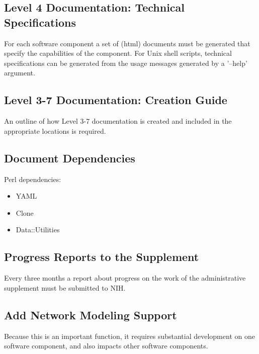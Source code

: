 \documentclass[12pt]{article}
\begin{document}
\subsection{Level 4 Documentation: Technical Specifications}

For each software component a set of (html) documents must be
generated that specify the capabilities of the component.  For Unix
shell scripts, technical specifications can be generated from the
usage messages generated by a '--help' argument.

\subsection{Level 3-7 Documentation: Creation Guide}

An outline of how Level 3-7 documentation is created and included in
the appropriate locations is required.


\subsection{Document Dependencies}

Perl dependencies:
\begin{itemize}
\item YAML
\item Clone
\item Data::Utilities
\end{itemize}


\subsection{Progress Reports to the Supplement}

Every three months a report about progress on the work of the
administrative supplement must be submitted to NIH.

\subsection{Add Network Modeling Support}

Because this is an important function, it requires substantial
development on one software component, and also impacts other software
components.
\end{document}
